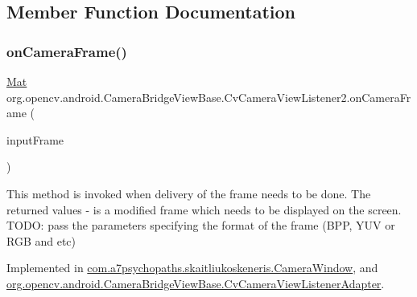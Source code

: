 \subsection{Member Function Documentation}
\mbox{\label{interfaceorg_1_1opencv_1_1android_1_1_camera_bridge_view_base_1_1_cv_camera_view_listener2_aa8cf69267ec5580344728dbadbf6ae0f}} 
\subsubsection{\texorpdfstring{on\+Camera\+Frame()}{onCameraFrame()}}
{\footnotesize\ttfamily \mbox{\hyperlink{classorg_1_1opencv_1_1core_1_1_mat}{Mat}} org.\+opencv.\+android.\+Camera\+Bridge\+View\+Base.\+Cv\+Camera\+View\+Listener2.\+on\+Camera\+Frame (\begin{DoxyParamCaption}\item[{\mbox{\hyperlink{interfaceorg_1_1opencv_1_1android_1_1_camera_bridge_view_base_1_1_cv_camera_view_frame}{Cv\+Camera\+View\+Frame}}}]{input\+Frame }\end{DoxyParamCaption})}

This method is invoked when delivery of the frame needs to be done. The returned values -\/ is a modified frame which needs to be displayed on the screen. T\+O\+DO\+: pass the parameters specifying the format of the frame (B\+PP, Y\+UV or R\+GB and etc) 

Implemented in \mbox{\hyperlink{classcom_1_1a7psychopaths_1_1skaitliukoskeneris_1_1_camera_window_a2ee3840e4c61b7ab95e2dc3f6407aad0}{com.\+a7psychopaths.\+skaitliukoskeneris.\+Camera\+Window}}, and \mbox{\hyperlink{classorg_1_1opencv_1_1android_1_1_camera_bridge_view_base_1_1_cv_camera_view_listener_adapter_a8e7517c94e210a4bd3176ae681babc4b}{org.\+opencv.\+android.\+Camera\+Bridge\+View\+Base.\+Cv\+Camera\+View\+Listener\+Adapter}}.

\mbox{\label{interfaceorg_1_1opencv_1_1android_1_1_camera_bridge_view_base_1_1_cv_camera_view_listener2_a8229eca0048f11f06e2cd798c10a1b4d}} 
